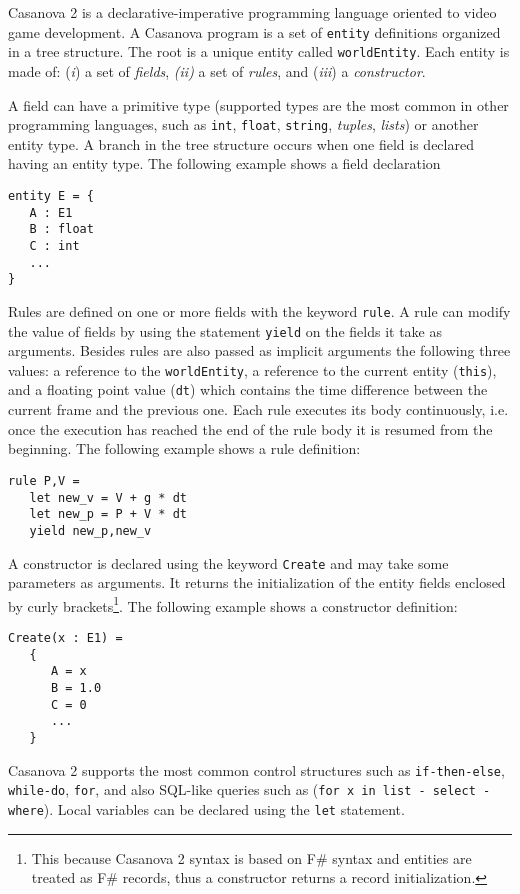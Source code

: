 Casanova 2 is a declarative-imperative programming language oriented to video game development. A Casanova program is a set of \texttt{entity} definitions organized in a tree structure. The root is a unique entity called \texttt{worldEntity}. Each entity is made of: (\textit{i}) a set of \textit{fields}, \textit{(ii)} a set of \textit{rules}, and (\textit{iii}) a \textit{constructor}. 

A field can have a primitive type (supported types are the most common in other programming languages, such as \texttt{int}, \texttt{float}, \texttt{string}, \textit{tuples}, \textit{lists}) or another entity type. A branch in the tree structure occurs when one field is declared having an entity type. The following example shows a field declaration

\begin{lstlisting}
entity E = {
   A : E1
   B : float
   C : int
   ...
}
\end{lstlisting}

Rules are defined on one or more fields with the keyword \texttt{rule}. A rule can modify the value of fields by using the statement \texttt{yield} on the fields it take as arguments. Besides rules are also passed as implicit arguments the following three values: a reference to the \texttt{worldEntity}, a reference to the current entity (\texttt{this}), and a floating point value (\texttt{dt}) which contains the time difference between the current frame and the previous one. Each rule executes its body continuously, i.e. once the execution has reached the end of the rule body it is resumed from the beginning. The following example shows a rule definition:

\begin{lstlisting}
rule P,V = 
   let new_v = V + g * dt
   let new_p = P + V * dt
   yield new_p,new_v
\end{lstlisting}

A constructor is declared using the keyword \texttt{Create} and may take some parameters as arguments. It returns the initialization of the entity fields enclosed by curly brackets\footnote{This because Casanova 2 syntax is based on F\# syntax and entities are treated as F\# records, thus a constructor returns a record initialization.}. The following example shows a constructor definition:

\begin{lstlisting}
Create(x : E1) =
   {
      A = x
      B = 1.0
      C = 0
      ...
   }
\end{lstlisting}

Casanova 2 supports the most common control structures such as \texttt{if-then-else}, \texttt{while-do}, \texttt{for}, and also SQL-like queries such as (\texttt{for x in list - select - where}). Local variables can be declared using the \texttt{let} statement.
